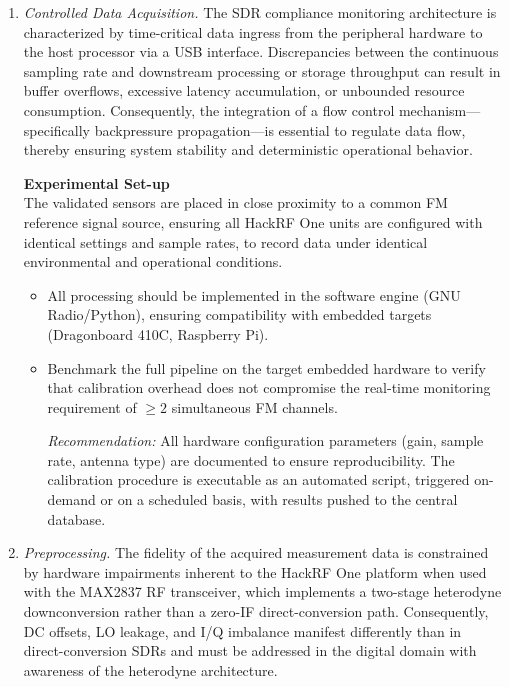 \documentclass[11pt]{report}
\begin{document}
\begin{enumerate}
	\item \textit{Controlled Data Acquisition.}
	The SDR compliance monitoring architecture is characterized by 
	time-critical data ingress from the peripheral hardware to the host 
	processor via a USB interface. Discrepancies between the continuous 
	sampling rate and downstream processing or storage throughput can result 	in buffer overflows, excessive latency accumulation, or unbounded resource consumption. Consequently, the integration of a flow control mechanism---specifically backpressure propagation---is essential to regulate data flow, thereby ensuring system stability and deterministic operational behavior.
	
	\begin{verticalrulelist}
	\textbf{Experimental Set-up} \\
	The validated sensors are placed in close proximity to a common FM reference signal source, ensuring all HackRF One units are configured with identical settings and sample rates, to record data under identical environmental and operational conditions.
	\begin{itemize}[label=$\triangleright$, leftmargin=*, itemsep=0.3em]	
		\item All processing should be implemented in the software engine (GNU Radio/Python), ensuring compatibility with embedded targets (Dragonboard 410C, Raspberry Pi). 
		\item Benchmark the full pipeline on the target embedded hardware to verify that calibration overhead does not compromise the real-time monitoring requirement of ${\geq} 2$ simultaneous FM channels.
		
		\textit{Recommendation:} All hardware configuration parameters (gain, sample rate, antenna type) are documented to ensure reproducibility. The calibration procedure is executable as an automated script, triggered on-demand or on a scheduled basis, with results pushed to the central database.
		
	\end{itemize}
	
\end{verticalrulelist}
	\item \textit{Preprocessing.} The fidelity of the acquired measurement data is constrained by hardware impairments inherent to the HackRF One platform when used with the MAX2837 RF transceiver, which implements a two-stage heterodyne downconversion rather than a zero-IF direct-conversion path. Consequently, DC offsets, LO leakage, and I/Q imbalance manifest differently than in direct-conversion SDRs and must be addressed in the digital domain with awareness of the heterodyne architecture.
	

\end{enumerate}
\end{document}
